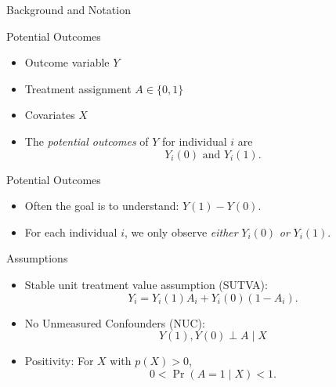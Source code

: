 \documentclass[handout]{beamer} %
\begin{document}
\begin{frame}

\begin{center}
    {\Large Background and Notation}
\end{center}

\end{frame}

\begin{frame}{Potential Outcomes}

\begin{itemize}
    \item<1-> Outcome variable $Y$
    \item<1-> Treatment assignment $A \in \{0, 1\}$
    \item<1-> Covariates $X$
    \item<2-> The \textit{potential outcomes} of $Y$ for individual $i$ are
    \[Y_i(0) \text{ and } Y_i(1).\]
\end{itemize}

\end{frame}

\begin{frame}{Potential Outcomes}

\begin{itemize}
    \item Often the goal is to understand: $Y(1) - Y(0)$.
    \item<2-> For each individual $i$, we only observe \textit{either} $Y_i(0)$
    \textit{or} $Y_i(1)$.
\end{itemize}

\end{frame}

\begin{frame}{Assumptions}

\begin{itemize}
    \item<2-> Stable unit treatment value assumption (SUTVA): 
    \[Y_i = Y_i(1) A_i + Y_i(0) (1 - A_i).\]
    \item<3-> No Unmeasured Confounders (NUC): 
    \[Y(1), Y(0) \perp A \mid X\]
    \item<4-> Positivity: For $X$ with $p(X) > 0$,
    \[0 < \Pr(A = 1 \mid X) < 1.\]
\end{itemize}

\end{frame}
\end{document}
